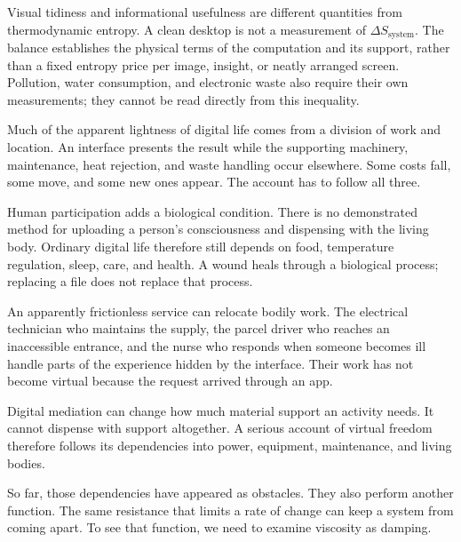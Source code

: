 Visual tidiness and informational usefulness are different quantities from thermodynamic entropy. A clean desktop is not a measurement of $\Delta S_{\mathrm{system}}$. The balance establishes the physical terms of the computation and its support, rather than a fixed entropy price per image, insight, or neatly arranged screen. Pollution, water consumption, and electronic waste also require their own measurements; they cannot be read directly from this inequality.

Much of the apparent lightness of digital life comes from a division of work and location. An interface presents the result while the supporting machinery, maintenance, heat rejection, and waste handling occur elsewhere. Some costs fall, some move, and some new ones appear. The account has to follow all three.


Human participation adds a biological condition. There is no demonstrated method for uploading a person's consciousness and dispensing with the living body. Ordinary digital life therefore still depends on food, temperature regulation, sleep, care, and health. A wound heals through a biological process; replacing a file does not replace that process.

An apparently frictionless service can relocate bodily work. The electrical technician who maintains the supply, the parcel driver who reaches an inaccessible entrance, and the nurse who responds when someone becomes ill handle parts of the experience hidden by the interface. Their work has not become virtual because the request arrived through an app.

Digital mediation can change how much material support an activity needs. It cannot dispense with support altogether. A serious account of virtual freedom therefore follows its dependencies into power, equipment, maintenance, and living bodies.

So far, those dependencies have appeared as obstacles. They also perform another function. The same resistance that limits a rate of change can keep a system from coming apart. To see that function, we need to examine viscosity as damping.
